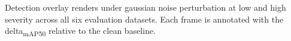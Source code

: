 \caption{Detection overlay renders under gaussian noise perturbation at low and high severity across all six evaluation datasets. Each frame is annotated with the delta\textsubscript{mAP50} relative to the clean baseline.}\label{fig:perturbation-plate-gaussian-noise}
